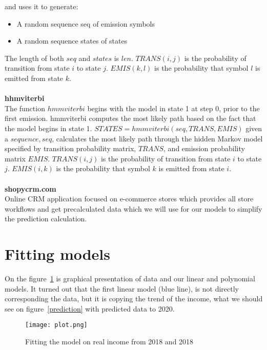 and uses it to generate:\\
\begin{itemize}
    \item A random sequence seq of emission symbols
    \item A random sequence states of states
\end{itemize}
The length of both $seq$ and $states$ is $len$.
$TRANS(i,j)$ is the probability of transition from state $i$ to state $j$.
$EMIS(k,l)$ is the probability that symbol $l$ is emitted from state $k$.\\
\\
\textbf{hhmviterbi}~\cite{hhmviterbi}\\
The function $hmmviterbi$ begins with the model in state 1 at step 0, prior to the first emission.
hmmviterbi computes the most likely path based on the fact that the model begins in state 1.
$STATES = hmmviterbi(seq,TRANS,EMIS)$ given a $sequence, seq$, calculates the most likely path through the hidden Markov model
specified by transition probability matrix, $TRANS$, and emission probability matrix $EMIS$. $TRANS(i,j)$ is the probability of transition from state $i$ to state $j$.
$EMIS(i,k)$ is the probability that symbol $k$ is emitted from state $i$.\\
\\
\textbf{shopycrm.com}\\
Online CRM application focused on e-commerce stores which provides all store workflows and get precalculated data which we will use for our models to simplify the prediction calculation.
\newpage
\section{Fitting models}
On the figure~\ref{plot} is graphical presentation of data and our linear and polynomial models.
It turned out that the first linear model (blue line), is not directly corresponding the data, but it is copying the trend of the income,
what we should see on figure~\ref{prediction} with predicted data to 2020.
\begin{figure}[h!]
    \begin{center}
        \texttt{[image: plot.png]}
    \end{center}
    \caption{Fitting the model on real income from 2018 and 2018}
    \label{plot}
\end{figure}\\
\newpage
